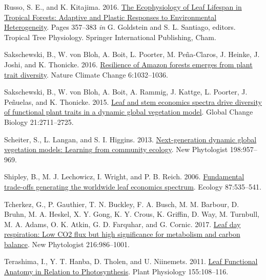 \documentclass[
  12pt,
  a4paper,
,tablecaptionabove
]{scrartcl}
\newlength{\cslhangindent}
\newenvironment{CSLReferences}[2] %
 {%
  \setlength{\parindent}{0pt}
  \ifodd #1 \everypar{\setlength{\hangindent}{\cslhangindent}}\ignorespaces\fi
  \ifnum #2 > 0
  \setlength{\parskip}{#2\baselineskip}
  \fi
 }%
 {}
\begin{document}
\begin{CSLReferences}{1}{0}
\leavevmode{}%
Russo, S. E., and K. Kitajima. 2016.
\href{https://doi.org/10.1007/978-3-319-27422-5_17}{The {Ecophysiology}
of {Leaf Lifespan} in {Tropical Forests}: {Adaptive} and {Plastic
Responses} to {Environmental Heterogeneity}}. Pages 357--383 \emph{in}
G. Goldstein and S. L. Santiago, editors. Tropical {Tree Physiology}.
{Springer International Publishing}, {Cham}.

\leavevmode{}%
Sakschewski, B., W. von Bloh, A. Boit, L. Poorter, M. Peña-Claros, J.
Heinke, J. Joshi, and K. Thonicke. 2016.
\href{https://doi.org/10.1038/nclimate3109}{Resilience of {Amazon}
forests emerges from plant trait diversity}. Nature Climate Change
6:1032--1036.

\leavevmode{}%
Sakschewski, B., W. von Bloh, A. Boit, A. Rammig, J. Kattge, L. Poorter,
J. Peñuelas, and K. Thonicke. 2015.
\href{https://doi.org/10.1111/gcb.12870}{Leaf and stem economics spectra
drive diversity of functional plant traits in a dynamic global
vegetation model}. Global Change Biology 21:2711--2725.

\leavevmode{}%
Scheiter, S., L. Langan, and S. I. Higgins. 2013.
\href{https://doi.org/10.1111/nph.12210}{Next-generation dynamic global
vegetation models: {Learning} from community ecology}. New Phytologist
198:957--969.

\leavevmode{}%
Shipley, B., M. J. Lechowicz, I. Wright, and P. B. Reich. 2006.
\href{https://doi.org/10.1890/05-1051}{Fundamental trade-offs generating
the worldwide leaf economics spectrum}. Ecology 87:535--541.

\leavevmode{}%
Tcherkez, G., P. Gauthier, T. N. Buckley, F. A. Busch, M. M. Barbour, D.
Bruhn, M. A. Heskel, X. Y. Gong, K. Y. Crous, K. Griffin, D. Way, M.
Turnbull, M. A. Adams, O. K. Atkin, G. D. Farquhar, and G. Cornic. 2017.
\href{https://doi.org/10.1111/nph.14816}{Leaf day respiration: Low {CO2}
flux but high significance for metabolism and carbon balance}. New
Phytologist 216:986--1001.

\leavevmode{}%
Terashima, I., Y. T. Hanba, D. Tholen, and U. Niinemets. 2011.
\href{https://doi.org/10.1104/pp.110.165472}{Leaf {Functional Anatomy}
in {Relation} to {Photosynthesis}}. Plant Physiology 155:108--116.


\end{CSLReferences}
\end{document}
